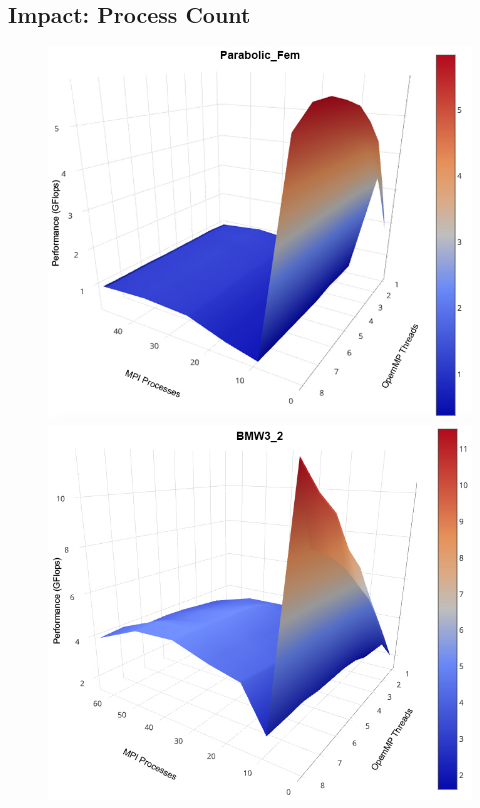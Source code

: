 \subsection{Impact: Process Count}\label{sec:dspmv-process}

\begin{figure}\begin{centering}
		\includegraphics[scale=0.25]{figures/parabolicFem_surface.jpg}
		\includegraphics[scale=0.25]{figures/bmw3_2_surface.jpg}

\end{centering}
\end{figure}
